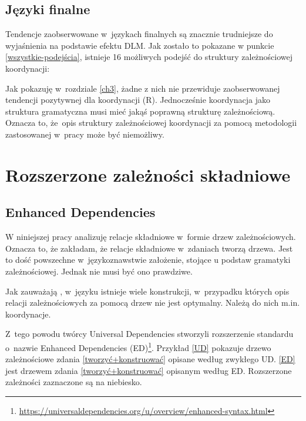 \subsection{Języki finalne}

Tendencje zaobserwowane w~językach finalnych są znacznie trudniejsze do wyjaśnienia na podstawie efektu DLM. Jak zostało to pokazane w punkcie \ref{wszystkie-podejścia}, istnieje 16 możliwych podejść do struktury zależnościowej koordynacji:



Jak pokazuję w~rozdziale \ref{ch3}, żadne z nich nie przewiduje zaobserwowanej tendencji pozytywnej dla koordynacji (R). Jednocześnie koordynacja jako struktura gramatyczna musi mieć jakąś poprawną strukturę zależnościową. Oznacza to, że~opis struktury zależnościowej koordynacji za pomocą metodologii zastosowanej w~pracy \cite{przepiorkowski2023conjunct} może być niemożliwy.

\section{Rozszerzone zależności składniowe}

\subsection{Enhanced Dependencies}

W niniejszej pracy analizuję relacje składniowe w~formie drzew zależnościowych. Oznacza to, że zakładam, że relacje składniowe w~zdaniach tworzą drzewa. Jest to dość powszechne w~językoznawstwie założenie, stojące u podstaw gramatyki zależnościowej. Jednak nie musi być ono prawdziwe. 

Jak zauważają \cite{de2021universal}, w~języku istnieje wiele konstrukcji, w~przypadku których opis relacji zależnościowych za pomocą drzew nie jest optymalny. Należą do nich m.in. koordynacje.

Z~tego powodu twórcy Universal Dependencies stworzyli rozszerzenie standardu o~nazwie Enhanced Dependencies (ED)\footnote{\url{https://universaldependencies.org/u/overview/enhanced-syntax.html}}. Przykład \eqref{UD} pokazuje drzewo zależnościowe zdania \eqref{tworzyć+konstruować} opisane według zwykłego UD. \eqref{ED} jest drzewem zdania \eqref{tworzyć+konstruować} opisanym według ED. Rozszerzone zależności zaznaczone są na niebiesko.

